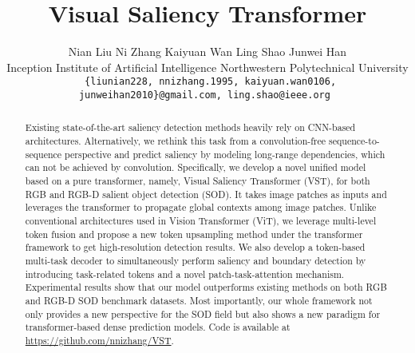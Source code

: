 \documentclass[10pt,twocolumn,letterpaper]{article}
\begin{document}
\title{Visual Saliency Transformer}

\author{
	Nian Liu\footnotemark[1]
	\hspace{25pt}
	Ni Zhang\footnotemark[1]
	\hspace{25pt}
	Kaiyuan Wan
	\hspace{25pt}
	Ling Shao
	\hspace{25pt}
	Junwei Han\footnotemark[2]
	\hspace{25pt}
	\\
	Inception Institute of Artificial Intelligence
	\hspace{8pt}
	Northwestern Polytechnical University
	\\
	{\tt\small
    \{liunian228, nnizhang.1995, kaiyuan.wan0106, junweihan2010\}@gmail.com, ling.shao@ieee.org
    }
}

\maketitle
{}

\ificcvfinal\thispagestyle{empty}\fi


\begin{abstract}
    Existing state-of-the-art saliency detection methods heavily rely on CNN-based architectures. 
    Alternatively, we rethink this task from a convolution-free sequence-to-sequence perspective and predict saliency by modeling long-range dependencies, which can not be achieved by convolution.
    Specifically, we develop a novel unified model based on a pure transformer, namely, Visual Saliency Transformer (VST), for both RGB and RGB-D salient object detection (SOD). It takes image patches as inputs and leverages the transformer to propagate global contexts among image patches.
    Unlike conventional architectures used in Vision Transformer (ViT), we leverage multi-level token fusion and propose a new token upsampling method under the transformer framework to get high-resolution detection results. 
    We also develop a token-based multi-task decoder to simultaneously perform saliency and boundary detection by introducing task-related tokens and a novel patch-task-attention mechanism.
    Experimental results show that our model outperforms existing methods on both RGB and RGB-D SOD benchmark datasets. Most importantly, our whole framework not only provides a new perspective for the SOD field but also shows a new paradigm for transformer-based dense prediction models. Code is available at \url{https://github.com/nnizhang/VST}.
\end{abstract}
\end{document}
